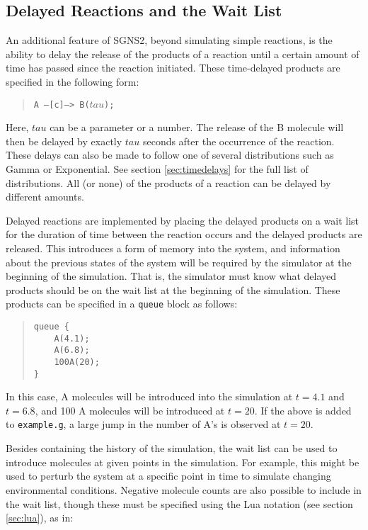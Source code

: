 \documentclass[10pt]{article}
\newcommand{\code}[1]{{\tt {#1}}}
\newcommand{\programname}{SGNS2}
\begin{document}
\subsection{Delayed Reactions and the Wait List}
\label{sec:ex-waitlist}

An additional feature of {\programname}, beyond simulating simple reactions, is the ability to delay the release of the products of a reaction until a certain amount of time has passed since the reaction initiated. These time-delayed products are specified in the following form:

\begin{quote}
\code{A --[c]--> B($tau$);}
\end{quote}

Here, $tau$ can be a parameter or a number. The release of the B molecule will then be delayed by exactly $tau$ seconds after the occurrence of the reaction. These delays can also be made to follow one of several distributions such as Gamma or Exponential. See section \ref{sec:timedelays} for the full list of distributions. All (or none) of the products of a reaction can be delayed by different amounts.

Delayed reactions are implemented by placing the delayed products on a wait list for the duration of time between the reaction occurs and the delayed products are released. This introduces a form of memory into the system, and information about the previous states of the system will be required by the simulator at the beginning of the simulation. That is, the simulator must know what delayed products should be on the wait list at the beginning of the simulation. These products can be specified in a \code{queue} block as follows:

\begin{quote}
\begin{verbatim}
queue {
    A(4.1);
    A(6.8);
    100A(20);
}
\end{verbatim}
\end{quote}

In this case, A molecules will be introduced into the simulation at $t = 4.1$ and $t = 6.8$, and 100 A molecules will be introduced at $t = 20$. If the above is added to \code{example.g}, a large jump in the number of A's is observed at $t=20$.

Besides containing the history of the simulation, the wait list can be used to introduce molecules at given points in the simulation. For example, this might be used to perturb the system at a specific point in time to simulate changing environmental conditions. Negative molecule counts are also possible to include in the wait list, though these must be specified using the Lua notation (see section \ref{sec:lua}), as in:
\end{document}
